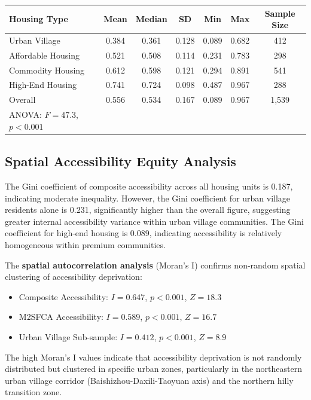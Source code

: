 \documentclass[preprint,12pt,authoryear]{elsarticle}
\begin{document}
\begin{threeparttable}
\caption{Composite Accessibility by Housing Type (Normalized 0-1 Scale)}
\label{tab:accessibility_by_housing}
\begin{tabular}{lcccccc}
\toprule
Housing Type & Mean & Median & SD & Min & Max & Sample Size \\
\midrule
Urban Village & 0.384 & 0.361 & 0.128 & 0.089 & 0.682 & 412 \\
Affordable Housing & 0.521 & 0.508 & 0.114 & 0.231 & 0.783 & 298 \\
Commodity Housing & 0.612 & 0.598 & 0.121 & 0.294 & 0.891 & 541 \\
High-End Housing & 0.741 & 0.724 & 0.098 & 0.487 & 0.967 & 288 \\
\midrule
Overall & 0.556 & 0.534 & 0.167 & 0.089 & 0.967 & 1,539 \\
\midrule
ANOVA: $F = 47.3$, $p < 0.001$ & & & & & & \\
\bottomrule
\end{tabular}
\end{threeparttable}

\subsection{Spatial Accessibility Equity Analysis}
\label{sec:equity_results}

The Gini coefficient of composite accessibility across all housing units is 0.187, indicating moderate inequality. However, the Gini coefficient for urban village residents alone is 0.231, significantly higher than the overall figure, suggesting greater internal accessibility variance within urban village communities. The Gini coefficient for high-end housing is 0.089, indicating accessibility is relatively homogeneous within premium communities.

The \textbf{spatial autocorrelation analysis} (Moran's I) confirms non-random spatial clustering of accessibility deprivation:

\begin{itemize}
    \item Composite Accessibility: $I = 0.647$, $p < 0.001$, $Z = 18.3$
    \item M2SFCA Accessibility: $I = 0.589$, $p < 0.001$, $Z = 16.7$
    \item Urban Village Sub-sample: $I = 0.412$, $p < 0.001$, $Z = 8.9$
\end{itemize}

The high Moran's I values indicate that accessibility deprivation is not randomly distributed but clustered in specific urban zones, particularly in the northeastern urban village corridor (Baishizhou-Daxili-Taoyuan axis) and the northern hilly transition zone.
\end{document}
